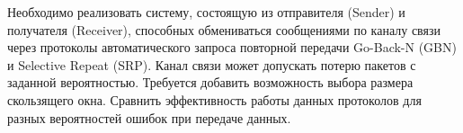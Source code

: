 Необходимо реализовать систему, состоящую из отправителя (Sender) и получателя
(Receiver), способных обмениваться сообщениями по каналу связи через
протоколы автоматического запроса повторной передачи Go-Back-N (GBN) и
Selective Repeat (SRP). Канал связи может допускать потерю пакетов с
заданной вероятностью. Требуется добавить возможность выбора размера скользящего
окна. Сравнить эффективность работы данных протоколов для разных
вероятностей ошибок при передаче данных.
